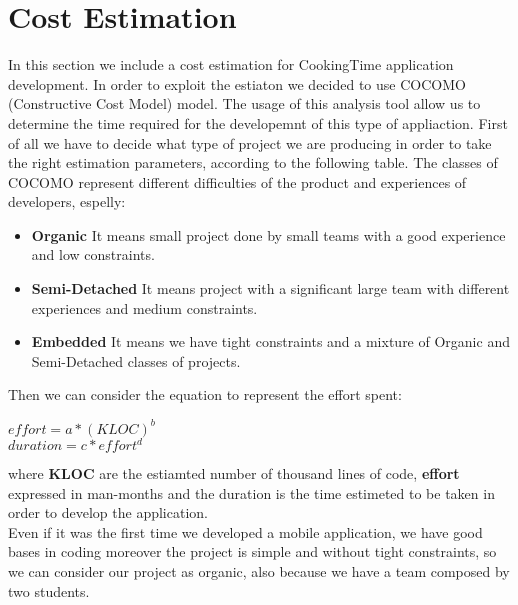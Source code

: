 \chapter{Cost Estimation}
In this section we include a cost estimation for CookingTime application development. In order to exploit the estiaton we decided to use COCOMO (Constructive Cost Model) model. The usage of this analysis tool allow us to determine the time required for the developemnt of this type of appliaction.
First of all we have to decide what type of project we are producing in order to take the right estimation parameters, according to the following table.
The classes of COCOMO represent different difficulties of the product and experiences of developers, espelly:
\begin{itemize}
	\item \textbf{Organic} It means small project done by small teams with a good experience and low constraints.
	\item \textbf{Semi-Detached} It means project with a significant large team with different experiences and medium constraints.
	\item \textbf{Embedded} It means we have tight constraints and a mixture of Organic and Semi-Detached classes of projects.
\end{itemize}
Then we can consider the equation to represent the effort spent:\\
\begin{center}
$ effort = a * (KLOC)^{b}$\\
$ duration = c * effort^{d}$\\
\end{center}
where \textbf{KLOC} are the estiamted number of thousand lines of code, \textbf{effort} expressed in man-months and the duration is the time estimeted to be taken in order to develop the application.\\
Even if it was the first time we developed a mobile application, we have good bases in coding moreover the project is simple and without tight constraints, so we can consider our project as organic, also because we have a team composed by two students.



